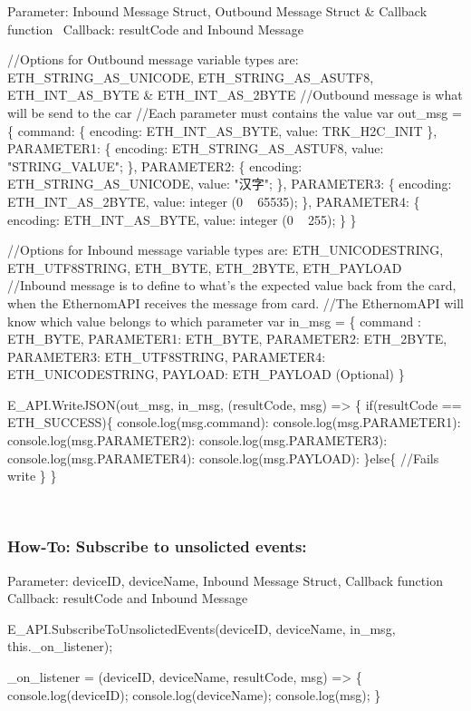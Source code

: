 Parameter\+: Inbound Message Struct, Outbound Message Struct \& Callback function~\newline
 Callback\+: result\+Code and Inbound Message 
\begin{DoxyCode}
//Options for Outbound message variable types are: ETH\_STRING\_AS\_UNICODE, ETH\_STRING\_AS\_ASUTF8,
       ETH\_INT\_AS\_BYTE & ETH\_INT\_AS\_2BYTE
//Outbound message is what will be send to the car
//Each parameter must contains the value
var out\_msg = \{
    command: \{
        encoding: ETH\_INT\_AS\_BYTE,
        value: TRK\_H2C\_INIT
    \},
    PARAMETER1: \{
        encoding: ETH\_STRING\_AS\_ASTUF8,
        value: "STRING\_VALUE";
    \},
    PARAMETER2: \{
        encoding: ETH\_STRING\_AS\_UNICODE,
        value: "汉字";
    \},
    PARAMETER3: \{
        encoding: ETH\_INT\_AS\_2BYTE,
        value: integer (0 ~ 65535);
    \},
    PARAMETER4: \{
        encoding: ETH\_INT\_AS\_BYTE,
        value: integer (0 ~ 255);
    \}
\}

//Options for Inbound message variable types are: ETH\_UNICODESTRING, ETH\_UTF8STRING, ETH\_BYTE, ETH\_2BYTE,
       ETH\_PAYLOAD
//Inbound message is to define to what's the expected value back from the card, when the EthernomAPI
       receives the message from card. 
//The EthernomAPI will know which value belongs to which parameter
var in\_msg  = \{
    command : ETH\_BYTE,
    PARAMETER1: ETH\_BYTE,
    PARAMETER2: ETH\_2BYTE,
    PARAMETER3: ETH\_UTF8STRING,
    PARAMETER4: ETH\_UNICODESTRING,
    PAYLOAD: ETH\_PAYLOAD (Optional)
\}

E\_API.WriteJSON(out\_msg, in\_msg, (resultCode, msg) => \{
    if(resultCode == ETH\_SUCCESS)\{
        console.log(msg.command):
        console.log(msg.PARAMETER1):
        console.log(msg.PARAMETER2):
        console.log(msg.PARAMETER3):
        console.log(msg.PARAMETER4):
        console.log(msg.PAYLOAD):
    \}else\{
        //Fails write
    \}
\}
\end{DoxyCode}
 ~\newline


\subsubsection*{How-\/\+To\+: Subscribe to unsolicted events\+:}

Parameter\+: device\+ID, device\+Name, Inbound Message Struct, Callback function~\newline
 Callback\+: result\+Code and Inbound Message 
\begin{DoxyCode}
E\_API.SubscribeToUnsolictedEvents(deviceID, deviceName, in\_msg, this.\_on\_listener);

\_on\_listener = (deviceID, deviceName, resultCode, msg) => \{
    console.log(deviceID);
    console.log(deviceName);
    console.log(msg);
\}
\end{DoxyCode}



